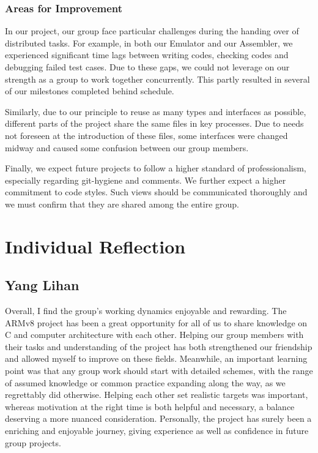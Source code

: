 \documentclass[11pt]{article}
\begin{document}
\subsubsection{Areas for Improvement}

In our project, our group face particular challenges during the handing over of distributed tasks. For example, in both our Emulator and our Assembler, we experienced significant time lags between writing codes, checking codes and debugging failed test cases. Due to these gaps, we could not leverage on our strength as a group to work together concurrently. This partly resulted in several of our milestones completed behind schedule.

Similarly, due to our principle to reuse as many types and interfaces as possible, different parts of the project share the same files in key processes. Due to needs not foreseen at the introduction of these files, some interfaces were changed midway and caused some confusion between our group members.

Finally, we expect future projects to follow a higher standard of professionalism, especially regarding git-hygiene and comments. We further expect a higher commitment to code styles. Such views should be communicated thoroughly and we must confirm that they are shared among the entire group.

\section{Individual Reflection}

\subsection{Yang Lihan}

Overall, I find the group's working dynamics enjoyable and rewarding. The ARMv8 project has been a great opportunity for all of us to share knowledge on C and computer architecture with each other. Helping our group members with their tasks and understanding of the project has both strengthened our friendship and allowed myself to improve on these fields. Meanwhile, an important learning point was that any group work should start with detailed schemes, with the range of assumed knowledge or common practice expanding along the way, as we regrettably did otherwise. Helping each other set realistic targets was important, whereas motivation at the right time is both helpful and necessary, a balance deserving a more nuanced consideration. Personally, the project has surely been a enriching and enjoyable journey, giving experience as well as confidence in future group projects.
\end{document}
